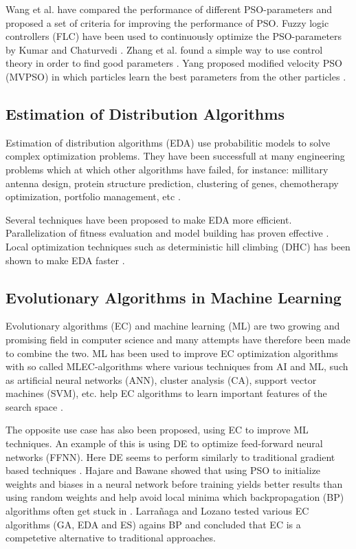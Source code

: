 Wang et al. \cite{dang2012selection} have compared the performance of different PSO-parameters and proposed a set of criteria for improving the performance of PSO. Fuzzy logic controllers (FLC) have been used to continuously optimize the PSO-parameters by Kumar and Chaturvedi \cite{kumar2011tuning}. Zhang et al. found a simple way to use control theory in order to find good parameters \cite{zhang2011simple}. Yang proposed modified velocity PSO (MVPSO) in which particles learn the best parameters from the other particles \cite{yang2011particle}.


\subsection{Estimation of Distribution Algorithms}

Estimation of distribution algorithms (EDA) use probabilitic models to solve complex optimization problems. They have been successfull at many engineering problems which at which other algorithms have failed, for instance: millitary antenna design, protein structure prediction, clustering of genes, chemotherapy optimization, portfolio management, etc \cite{Hauschild2011111}.

Several techniques have been proposed to make EDA more efficient. Parallelization of fitness evaluation and model building has proven effective \cite{sastry2007towards}. Local optimization techniques such as deterministic hill climbing (DHC) has been shown to make EDA faster \cite{hart1994adaptive}.

\subsection{Evolutionary Algorithms in Machine Learning}

Evolutionary algorithms (EC) and machine learning (ML) are two growing and promising field in computer science and many attempts have therefore been made to combine the two. ML has been used to improve EC optimization algorithms with so called MLEC-algorithms where various techniques from AI and ML, such as artificial neural networks (ANN), cluster analysis (CA), support vector machines (SVM), etc. help EC algorithms to learn important features of the search space \cite{6052374}.

The opposite use case has also been proposed, using EC to improve ML techniques. An example of this is using DE to optimize feed-forward neural networks (FFNN). Here DE seems to perform similarly to traditional gradient based techniques \cite{ilonen2003differential}. Hajare and Bawane showed that using PSO to initialize weights and biases in a neural network before training yields better results than using random weights and help avoid local minima which backpropagation (BP) algorithms often get stuck in \cite{hajare2015feed}. Larra{\~n}aga and Lozano \cite{larranaga2001estimation} tested various EC algorithms (GA, EDA and ES) agains BP and concluded that EC is a competetive alternative to traditional approaches.

